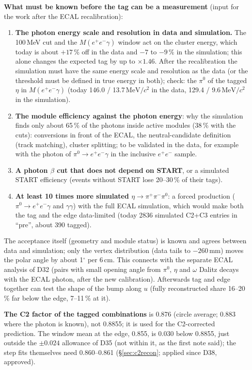 \documentclass[11pt,a4paper]{article}
\newcommand{\piz}{\ensuremath{\pi^{0}}\xspace}
\newcommand{\ee}{\ensuremath{e^{+}e^{-}}\xspace}
\newcommand{\pipi}{\ensuremath{\pi^{+}\pi^{-}}\xspace}
\newcommand{\MeVcc}{\ensuremath{\mathrm{MeV}/c^{2}}\xspace}
\begin{document}
\textbf{What must be known before the tag can be a measurement} (input for the work after the ECAL recalibration):
\begin{enumerate}\setlength{\itemsep}{1pt}
\item \textbf{The photon energy scale and resolution in data and simulation.} The 100\,MeV cut and the $M(\ee\gamma)$ window act on the cluster
      energy, which today is about $+17$\,\% off in the data and $-7$ to $-9$\,\% in the simulation; this alone changes the expected tag by up to
      $\times1.46$. After the recalibration the simulation must have the same energy scale and resolution as the data (or the threshold must be
      defined in true energy in both); check: the \piz of the tagged $\eta$ in $M(\ee\gamma)$ (today 146.0 / 13.7\,\MeVcc in the data, 129.4 /
      9.6\,\MeVcc in the simulation).
\item \textbf{The module efficiency against the photon energy}: why the simulation finds only about 65\,\% of the photons inside active modules
      (38\,\% with the cuts): conversions in front of the ECAL, the neutral-candidate definition (track matching), cluster splitting; to be
      validated in the data, for example with the photon of $\piz\to\ee\gamma$ in the inclusive \ee sample.
\item \textbf{A photon $\beta$ cut that does not depend on START}, or a simulated START efficiency (events without START lose 20--30\,\% of their
      tags).
\item \textbf{At least 10 times more simulated $\eta\to\pipi\piz$}: a forced production ($\piz\to\ee\gamma$ and $\gamma\gamma$) with the full ECAL
      simulation, which would make both the tag and the edge data-limited (today 2836 simulated C2+C3 entries in ``pre'', about 390 tagged).
\end{enumerate}
The acceptance itself (geometry and module status) is known and agrees between data and simulation; only the vertex distribution (data tails to
$-260$\,mm) moves the polar angle by about 1$^\circ$ per 6\,cm. This connects with the separate ECAL analysis of D32 (pairs with small opening
angle from \piz, $\eta$ and $\omega$ Dalitz decays with the ECAL photon, after the new calibration). Afterwards tag and edge together can test the
shape of the bump along $u$ (fully reconstructed share 16--20\,\% far below the edge, 7--11\,\% at it).

\textbf{The C2 factor of the tagged combinations} is 0.876 (circle average; 0.883 where the photon is known), not 0.8855; it is used for the C2-corrected
prediction. The window mean at the edge, 0.855, is 0.030 below 0.8855, just outside the $\pm0.024$ allowance of D35 (not within it, as the first
note said); the step fits themselves need 0.860--0.861 (\S\ref{sec:c2recon}; applied since D38, approved).
\end{document}
